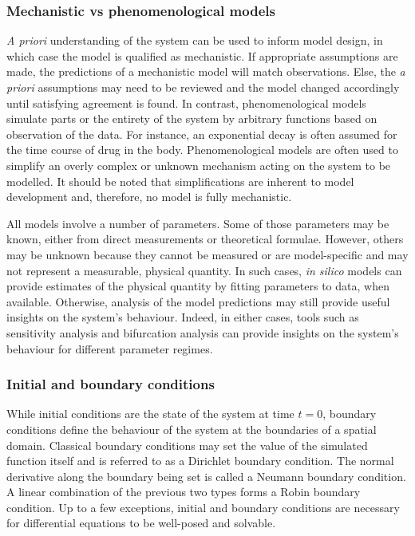 \documentclass{article}
\begin{document}
\subsubsection*{Mechanistic vs phenomenological models}
\textit{A priori} understanding of the system can be used to inform model design, in which case the model is qualified as mechanistic.
If appropriate assumptions are made, the predictions of a mechanistic model will match observations.
Else, the \textit{a priori} assumptions may need to be reviewed and the model changed accordingly until satisfying agreement is found.
In contrast, phenomenological models simulate parts or the entirety of the system by arbitrary functions based on observation of the data.
For instance, an exponential decay is often assumed for the time course of drug in the body.
Phenomenological models are often used to simplify an overly complex or unknown mechanism acting on the system to be modelled.
It should be noted that simplifications are inherent to model development and, therefore, no model is fully mechanistic.

All models involve a number of parameters.
Some of those parameters may be known, either from direct measurements or theoretical formulae.
However, others may be unknown because they cannot be measured or are model-specific and may not represent a measurable, physical quantity.
In such cases, \textit{in silico} models can provide estimates of the physical quantity by fitting parameters to data, when available.
Otherwise, analysis of the model predictions may still provide useful insights on the system's behaviour.
Indeed, in either cases, tools such as sensitivity analysis and bifurcation analysis can provide insights on the system's behaviour for different parameter regimes.

\subsubsection*{Initial and boundary conditions}
While initial conditions are the state of the system at time $t=0$, boundary conditions define the behaviour of the system at the boundaries of a spatial domain.
Classical boundary conditions may set the value of the simulated function itself and is referred to as a Dirichlet boundary condition. The normal derivative along the boundary being set is called a Neumann boundary condition. A linear combination of the previous two types forms a Robin boundary condition.
Up to a few exceptions, initial and boundary conditions are necessary for differential equations to be well-posed and solvable.
\end{document}

